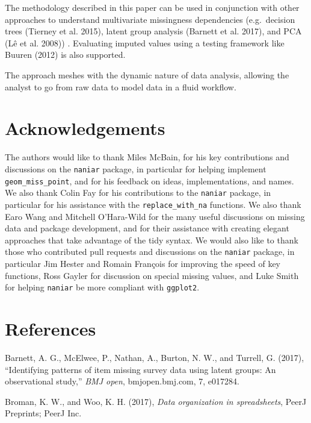 \documentclass[]{article}
\theoremstyle{definition}
\theoremstyle{definition}
\theoremstyle{definition}
\theoremstyle{remark}
\begin{document}
The methodology described in this paper can be used in conjunction with
other approaches to understand multivariate missingness dependencies
(e.g.~decision trees (Tierney et al. 2015), latent group analysis
(Barnett et al. 2017), and PCA (Lê et al. 2008)) . Evaluating imputed
values using a testing framework like Buuren (2012) is also supported.

The approach meshes with the dynamic nature of data analysis, allowing
the analyst to go from raw data to model data in a fluid workflow.

\newpage

\hypertarget{acknowledgements}{%
\section{Acknowledgements}\label{acknowledgements}}

The authors would like to thank Miles McBain, for his key contributions
and discussions on the \texttt{naniar} package, in particular for
helping implement \texttt{geom\_miss\_point}, and for his feedback on
ideas, implementations, and names. We also thank Colin Fay for his
contributions to the \texttt{naniar} package, in particular for his
assistance with the \texttt{replace\_with\_na} functions. We also thank
Earo Wang and Mitchell O'Hara-Wild for the many useful discussions on
missing data and package development, and for their assistance with
creating elegant approaches that take advantage of the tidy syntax. We
would also like to thank those who contributed pull requests and
discussions on the \texttt{naniar} package, in particular Jim Hester and
Romain François for improving the speed of key functions, Ross Gayler
for discussion on special missing values, and Luke Smith for helping
\texttt{naniar} be more compliant with \texttt{ggplot2}.

\hypertarget{references}{%
\section*{References}\label{references}}

\hypertarget{refs}{}
\leavevmode\hypertarget{ref-Barnett2017}{}%
Barnett, A. G., McElwee, P., Nathan, A., Burton, N. W., and Turrell, G.
(2017), ``Identifying patterns of item missing survey data using latent
groups: An observational study,'' \emph{BMJ open}, bmjopen.bmj.com, 7,
e017284.

\leavevmode\hypertarget{ref-Broman2017}{}%
Broman, K. W., and Woo, K. H. (2017), \emph{Data organization in
spreadsheets}, PeerJ Preprints; PeerJ Inc.
\end{document}
